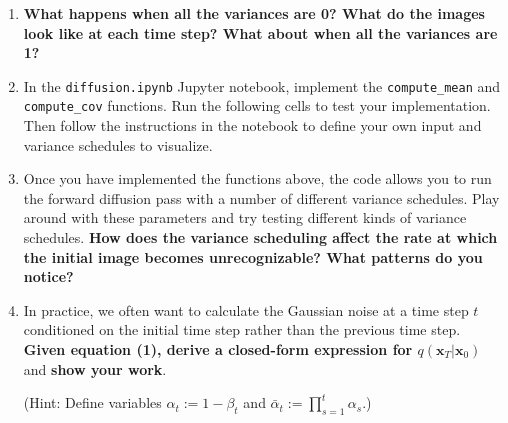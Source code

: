 \documentclass{article}
\begin{document}
\begin{enumerate}
\item
\textbf{What happens when all the variances are 0? What do the images look like at each time step? What about when all the variances are 1?}



\item
In the \verb|diffusion.ipynb| Jupyter notebook, implement the \verb|compute_mean| and \verb|compute_cov| functions. Run the following cells to test your implementation. Then follow the instructions in the notebook to define your own input and variance schedules to visualize.



\item
Once you have implemented the functions above, the code allows you to run the forward diffusion pass with a number of different variance schedules. Play around with these parameters and try testing different kinds of variance schedules. \textbf{How does the variance scheduling affect the rate at which the initial image becomes unrecognizable? What patterns do you notice?}



\item
In practice, we often want to calculate the Gaussian noise at a time step $t$ conditioned on the initial time step rather than the previous time step. \textbf{Given equation (1), derive a closed-form expression for $q(\textbf{x}_{T}|\textbf{x}_{0})$} and \textbf{show your work}. 

(Hint: Define variables $\alpha_t := 1 - \beta_t$ and $\bar\alpha_t := \prod_{s = 1}^{t}\alpha_s$.)


\end{enumerate}
\end{document}
